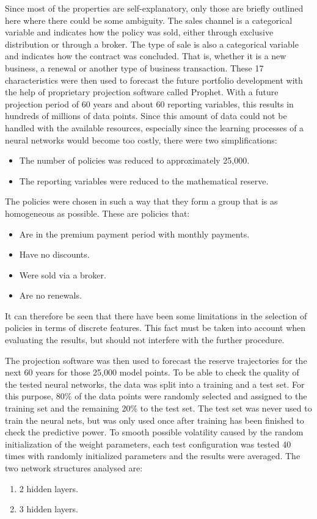 Since most of the properties are self-explanatory, only those are briefly outlined here where there could be some ambiguity. The sales channel is a categorical variable and indicates how the policy was sold, either through exclusive distribution or through a broker. The type of sale is also a categorical variable and indicates how the contract was concluded. That is, whether it is a new business, a renewal or another type of business transaction. These 17 characteristics were then used to forecast the future portfolio development with the help of proprietary projection software called Prophet. With a future projection period of 60 years and about 60 reporting variables, this results in hundreds of millions of data points. Since this amount of data could not be handled with the available resources, especially since the learning processes of a neural networks would become too costly, there were two simplifications:
\begin{itemize}
	\item The number of policies was reduced to approximately 25,000. 
	\item The reporting variables were reduced to the mathematical reserve.
\end{itemize}
The policies were chosen in such a way that they form a group that is as homogeneous as possible. These are policies that:
\begin{itemize}
	\item Are in the premium payment period with monthly payments.
	\item Have no discounts.
	\item Were sold via a broker.
	\item Are no renewals. 
\end{itemize}
It can therefore be seen that there have been some limitations in the selection of policies in terms of discrete features. This fact must be taken into account when evaluating the results, but should not interfere with the further procedure.

The projection software was then used to forecast the reserve trajectories for the next 60 years for those 25,000 model points. To be able to check the quality of the tested neural networks, the data was split into a training and a test set. For this purpose, 80\% of the data points were randomly selected and assigned to the training set and the remaining 20\% to the test set. The test set was never used to train the neural nets, but was only used once after training has been finished to check the predictive power. To smooth possible volatility caused by the random initialization of the weight parameters, each test configuration was tested 40 times with randomly initialized parameters and the results were averaged. The two network structures analysed are:
\begin{enumerate}[label=\Roman*)]
	\item 2 hidden layers.
	\item 3 hidden layers.
\end{enumerate}

